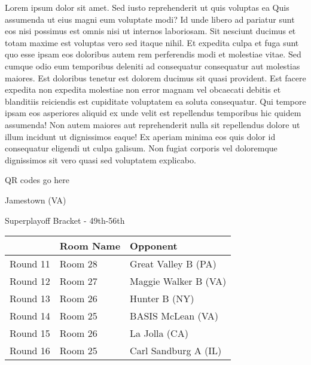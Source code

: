 \documentclass{article}%
\begin{document}
\vspace*{8pt}%
\linebreak%
\newline%
\newline%
    Lorem ipsum dolor sit amet. Sed iusto reprehenderit ut quis voluptas ea Quis assumenda ut eius magni eum voluptate modi? Id unde libero ad pariatur sunt eos nisi possimus est omnis nisi ut internos laboriosam. Sit nesciunt ducimus et totam maxime est voluptas vero sed itaque nihil. Et expedita culpa et fuga sunt quo esse ipsam eos doloribus autem rem perferendis modi et molestiae vitae.\newline%
\newline%
    Sed cumque odio eum temporibus deleniti ad consequatur consequatur aut molestias maiores. Est doloribus tenetur est dolorem ducimus sit quasi provident. Est facere expedita non expedita molestiae non error magnam vel obcaecati debitis et blanditiis reiciendis est cupiditate voluptatem ea soluta consequatur. Qui tempore ipsam eos asperiores aliquid ex unde velit est repellendus temporibus hic quidem assumenda!\newline%
\newline%
    Non autem maiores aut reprehenderit nulla sit repellendus dolore ut illum incidunt ut dignissimos eaque! Ex aperiam minima eos quis dolor id consequatur eligendi ut culpa galisum. Non fugiat corporis vel doloremque dignissimos sit vero quasi sed voluptatem explicabo.\newline%
\newline%
\vspace*{30pt}%
\begin{center}%
\begin{Huge}%
QR codes go here%
\end{Huge}%
\end{center}%
\newpage%
\begin{center}%
\begin{Huge}%
Jamestown (VA)%
\end{Huge}%
\vspace*{8pt}%
\linebreak%
\begin{Large}%
Superplayoff Bracket {-} 49th{-}56th%
\end{Large}%
\end{center}%
%
\begin{tabularx}{\textwidth}{|c|Y|Y|}%
\hline%
&Room Name&Opponent\\%
\hline%
Round 11&Room 28&Great Valley B (PA)\\%
Round 12&Room 27&Maggie Walker B (VA)\\%
Round 13&Room 26&Hunter B (NY)\\%
Round 14&Room 25&BASIS McLean (VA)\\%
Round 15&Room 26&La Jolla (CA)\\%
Round 16&Room 25&Carl Sandburg A (IL)\\%
\hline%
\end{tabularx}%
\end{document}
